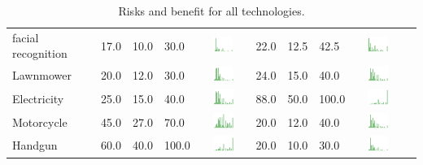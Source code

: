 \begin{table}[t]
\begin{center}
\begin{tabular}{| p{2cm} | p{1cm} | p{1cm} | p{1cm} | c | p{2cm} | p{1cm} | p{1cm} | p{1cm} | c |}
facial recognition & 17.0 & 10.0 & 30.0 & \includegraphics[width = 2cm, height = 0.5cm]{tex-inputs/appendix/riskbenefit-images/facialrecognitionrisk} & 22.0 & 12.5 & 42.5 & \includegraphics[width = 2cm, height = 0.5cm]{tex-inputs/appendix/riskbenefit-images/facialrecognitionben} \\ 

Lawnmower & 20.0 & 12.0 & 30.0 & \includegraphics[width = 2cm, height = 0.5cm]{tex-inputs/appendix/riskbenefit-images/LawnmowerRisk} & 24.0 & 15.0 & 40.0 & \includegraphics[width = 2cm, height = 0.5cm]{tex-inputs/appendix/riskbenefit-images/LawnmowerBenefit} \\ 
Electricity & 25.0 & 15.0 & 40.0 & \includegraphics[width = 2cm, height = 0.5cm]{tex-inputs/appendix/riskbenefit-images/ElectricityRisk} & 88.0 & 50.0 & 100.0 & \includegraphics[width = 2cm, height = 0.5cm]{tex-inputs/appendix/riskbenefit-images/ElectricityBenefit} \\ 

Motorcycle & 45.0 & 27.0 & 70.0 & \includegraphics[width = 2cm, height = 0.5cm]{tex-inputs/appendix/riskbenefit-images/MotorcycleRisk}  & 20.0 & 12.0 & 40.0 & \includegraphics[width = 2cm, height = 0.5cm]{tex-inputs/appendix/riskbenefit-images/MotorcycleBenefit} \\ 
Handgun & 60.0 & 40.0 & 100.0 & \includegraphics[width = 2cm, height = 0.5cm]{tex-inputs/appendix/riskbenefit-images/HandgunRisk} & 20.0 & 10.0 & 30.0 & \includegraphics[width = 2cm, height = 0.5cm]{tex-inputs/appendix/riskbenefit-images/HandgunBenefit} \\ 


\hline
\end{tabular}
\caption{Risks and benefit for all technologies.}
\label{allriskben}
\end{center}
\end{table}
